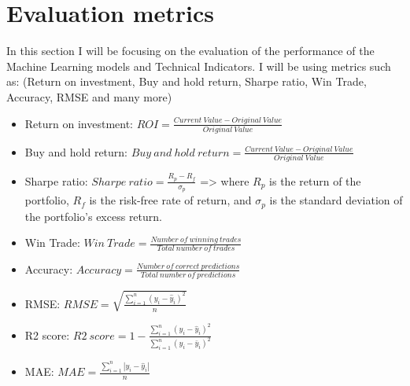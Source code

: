\documentclass{imc-inf}
\begin{document}
	\section{Evaluation metrics}
		In this section I will be focusing on the evaluation of the performance of the Machine Learning models and Technical Indicators.
		I will be using metrics such as: (Return on investment, Buy and hold return, Sharpe ratio, Win Trade, Accuracy, RMSE and many more)
		\begin{itemize}
			\item Return on investment: $ROI = \frac{Current\ Value - Original\ Value}{Original\ Value}$
			\item Buy and hold return: $Buy\ and\ hold\ return = \frac{Current\ Value - Original\ Value}{Original\ Value}$
			\item Sharpe ratio: $Sharpe\ ratio = \frac{R_p - R_f}{\sigma_p}$ => where $R_p$ is the return of the portfolio, $R_f$ is the risk-free rate of return, and $\sigma_p$ is the standard deviation of the portfolio's excess return.
			\item Win Trade: $Win\ Trade = \frac{Number\ of\ winning\ trades}{Total\ number\ of\ trades}$
			\item Accuracy: $Accuracy = \frac{Number\ of\ correct\ predictions}{Total\ number\ of\ predictions}$
			\item RMSE: $RMSE = \sqrt{\frac{\sum_{i=1}^{n} (y_i - \hat{y}_i)^2}{n}}$
			\item R2 score: $R2\ score = 1 - \frac{\sum_{i=1}^{n} (y_i - \hat{y}_i)^2}{\sum_{i=1}^{n} (y_i - \bar{y}_i)^2}$
			\item MAE: $MAE = \frac{\sum_{i=1}^{n} |y_i - \hat{y}_i|}{n}$
			\end{itemize}
\end{document}
